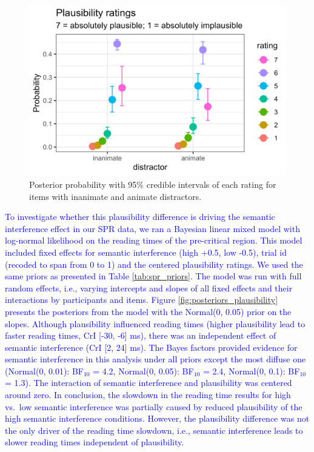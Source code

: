 \documentclass[a4paper, man, floatsintext]{apa7}
\begin{document}
{\begin{figure}[htpb]
    \centering
        \caption{Posterior probability with 95\% credible intervals of each rating for items with inanimate and animate distractors.}
    \label{fig:plausibility_anim_inanim}
    \includegraphics[width=0.8\linewidth]{images/plausibility_anim_inan.jpg}
\end{figure}

\textcolor{blue}{To investigate whether this plausibility difference is driving the semantic interference effect in our SPR data, we ran a Bayesian linear mixed model with log-normal likelihood on the reading times of the pre-critical region. This model included fixed effects for semantic interference (high +0.5, low -0.5), trial id (recoded to span from 0 to 1) and the centered plausibility ratings. We used the same priors as presented in Table \ref{tab:spr_priors}. The model was run with full random effects, i.e., varying intercepts and slopes of all fixed effects and their interactions by participants and items. Figure \ref{fig:posteriors_plausibility} presents the posteriors from the model with the Normal(0, 0.05) prior on the slopes. Although plausibility influenced reading times (higher plausibility lead to faster reading times, CrI [-30, -6] ms), there was an independent effect of semantic interference (CrI [2, 24] ms). The Bayes factors provided evidence for semantic interference in this analysis under all priors except the most diffuse one (Normal(0, 0.01): BF$_{10}$ = 4.2,
Normal(0, 0.05): BF$_{10}$ = 2.4,
Normal(0, 0.1): BF$_{10}$ = 1.3). The interaction of semantic interference and plausibility was centered around zero. In conclusion, the slowdown in the reading time results for high vs.\ low semantic interference was partially caused by reduced plausibility of the high semantic interference conditions. However, the plausibility difference was not the only driver of the reading time slowdown, i.e., semantic interference leads to slower reading times independent of plausibility.}

}
\end{document}
